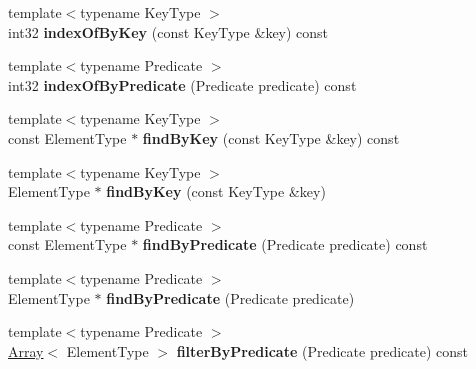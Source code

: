 \begin{DoxyCompactItemize}
\mbox{\label{class_arcana_1_1_array_ab6c8e606ca971442601228e9e7d33915}} 
{\footnotesize template$<$typename Key\+Type $>$ }\\int32 {\bfseries index\+Of\+By\+Key} (const Key\+Type \&key) const
\item 
\mbox{\label{class_arcana_1_1_array_a4a65e9390a9eb3d6261a9b2eeb36850e}} 
{\footnotesize template$<$typename Predicate $>$ }\\int32 {\bfseries index\+Of\+By\+Predicate} (Predicate predicate) const
\item 
\mbox{\label{class_arcana_1_1_array_af0144676076185e4e04b0a55e1908d87}} 
{\footnotesize template$<$typename Key\+Type $>$ }\\const Element\+Type $\ast$ {\bfseries find\+By\+Key} (const Key\+Type \&key) const
\item 
\mbox{\label{class_arcana_1_1_array_ac2a08c383188b119963d6cf1ae3d346f}} 
{\footnotesize template$<$typename Key\+Type $>$ }\\Element\+Type $\ast$ {\bfseries find\+By\+Key} (const Key\+Type \&key)
\item 
\mbox{\label{class_arcana_1_1_array_a84a805f1dae325c1e8cc771649f62742}} 
{\footnotesize template$<$typename Predicate $>$ }\\const Element\+Type $\ast$ {\bfseries find\+By\+Predicate} (Predicate predicate) const
\item 
\mbox{\label{class_arcana_1_1_array_a06e35742517a26330ab18ee560bd431f}} 
{\footnotesize template$<$typename Predicate $>$ }\\Element\+Type $\ast$ {\bfseries find\+By\+Predicate} (Predicate predicate)
\item 
\mbox{\label{class_arcana_1_1_array_ac4a0b81bfd32672a08de73e93e7ebf38}} 
{\footnotesize template$<$typename Predicate $>$ }\\\mbox{\hyperlink{class_arcana_1_1_array}{Array}}$<$ Element\+Type $>$ {\bfseries filter\+By\+Predicate} (Predicate predicate) const
\item 
\mbox{\label{class_arcana_1_1_array_a23b45b0a84e1c69d9b52678c6ecc08b3}} 

\end{DoxyCompactItemize}
